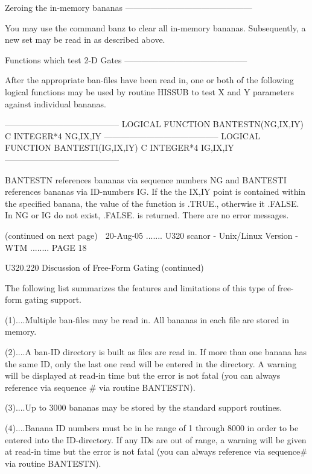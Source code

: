    Zeroing the in-memory bananas ---------------------------------------------
 
   You may use the command banz to clear all in-memory bananas.  Subsequently,
   a new set may be read in as described above.
 
   Functions which test 2-D Gates --------------------------------------------
 
   After  the  appropriate  ban-files  have  been  read in, one or both of the
   following logical functions may be used by routine HISSUB to test X  and  Y
   parameters against individual bananas.
 
   -----------------------------------------
         LOGICAL FUNCTION BANTESTN(NG,IX,IY)
   C
         INTEGER*4 NG,IX,IY
   -----------------------------------------
         LOGICAL FUNCTION BANTESTI(IG,IX,IY)
   C
         INTEGER*4 IG,IX,IY
   -----------------------------------------
 
   BANTESTN references bananas via sequence numbers NG and BANTESTI references
   bananas  via  ID-numbers IG. If the the IX,IY point is contained within the
   specified banana, the value of the function is .TRUE., otherwise it .FALSE.
   In NG or IG do not exist, .FALSE. is returned. There are no error messages.
 
                            (continued on next page)
    
   20-Aug-05 ....... U320  scanor - Unix/Linux Version - WTM ........ PAGE  18
 
 
   U320.220  Discussion of Free-Form Gating (continued)
 
   The following list summarizes the features and limitations of this type  of
   free-form gating support.
 
   (1)....Multiple  ban-files  may  be  read  in. All bananas in each file are
          stored in memory.
 
   (2)....A ban-ID directory is built as files are read in. If more  than  one
          banana  has  the  same ID, only the last one read will be entered in
          the directory. A warning will be displayed at read-in time  but  the
          error  is  not  fatal  (you  can always reference via sequence # via
          routine BANTESTN).
 
   (3)....Up to 3000 bananas may be stored by the standard support routines.
 
   (4)....Banana ID numbers must be in he range of 1 through 8000 in order  to
          be  entered  into  the  ID-directory. If any IDs are out of range, a
          warning will be given at read-in time but the  error  is  not  fatal
          (you can always reference via sequence# via routine BANTESTN).
 
